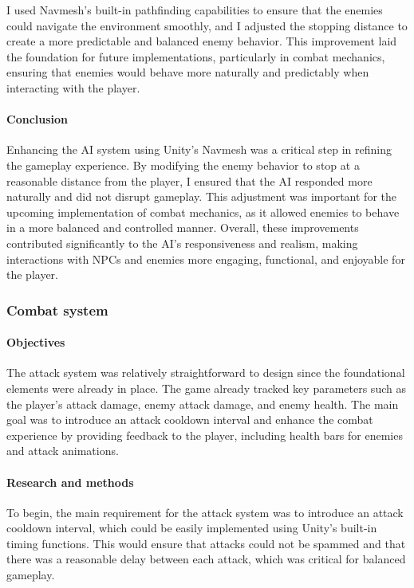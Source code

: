 \documentclass{article}
\begin{document}
I used Navmesh's built-in pathfinding capabilities to ensure that the enemies could navigate the environment smoothly, and I adjusted the stopping distance to create a more predictable and balanced enemy behavior. This improvement laid the foundation for future implementations, particularly in combat mechanics, ensuring that enemies would behave more naturally and predictably when interacting with the player.

\paragraph{Conclusion}\hfill

Enhancing the AI system using Unity's Navmesh was a critical step in refining the gameplay experience. By modifying the enemy behavior to stop at a reasonable distance from the player, I ensured that the AI responded more naturally and did not disrupt gameplay. This adjustment was important for the upcoming implementation of combat mechanics, as it allowed enemies to behave in a more balanced and controlled manner. Overall, these improvements contributed significantly to the AI's responsiveness and realism, making interactions with NPCs and enemies more engaging, functional, and enjoyable for the player.



\subsubsection{Combat system}
\paragraph{Objectives}\hfill

The attack system was relatively straightforward to design since the foundational elements were already in place. The game already tracked key parameters such as the player's attack damage, enemy attack damage, and enemy health. The main goal was to introduce an attack cooldown interval and enhance the combat experience by providing feedback to the player, including health bars for enemies and attack animations.

\paragraph{Research and methods}\hfill

To begin, the main requirement for the attack system was to introduce an attack cooldown interval, which could be easily implemented using Unity's built-in timing functions. This would ensure that attacks could not be spammed and that there was a reasonable delay between each attack, which was critical for balanced gameplay.\\
\end{document}
